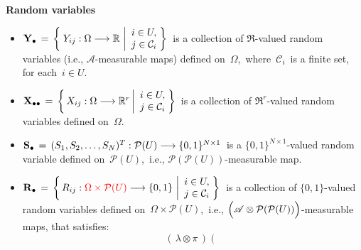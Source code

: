 \vskip 0.2cm
\noindent
\textbf{Random variables}
\begin{itemize}
\item
    $
    \mathbf{Y}_{\bullet}
    \, = \,
        \left\{\;
            Y_{ij} : \Omega \longrightarrow \mathbb{R}
            \,\left\vert
            \begin{array}{c} i \in U, \\ j \in \mathcal{C}_{i} \end{array}
            \right.
            \!\!\right\}
    $\,
    is a collection of $\Re$-valued random variables
    (i.e., $\mathscr{A}$-measurable maps)
    defined on \,$\Omega$,\,
    where \,$\mathcal{C}_{i}$\, is a finite set, for each \,$i \in U$.
\item
    $
    \mathbf{X}_{\bullet\bullet}
    \, = \,
        \left\{\,
            X_{ij} : \Omega \longrightarrow \mathbb{R}^{r}
            \left\vert
            \begin{array}{c} i \in U, \\ j \in \mathcal{C}_{i} \end{array}
            \right.
            \!\!\right\}
    $\,
    is a collection of $\Re^{r}$-valued random variables defined on \,$\Omega$.\,
\item
    $\mathbf{S}_{\bullet} \,=\, (S_{1},S_{2},\ldots,S_{N})^{T} : \mathcal{P}(U) \longrightarrow \{0,1\}^{N \times 1}$\,
    is a $\{0,1\}^{N \times 1}$-valued random variable defined on \,$\mathcal{P}(U)$,\,
    i.e., $\mathcal{P}(\mathcal{P}(U))$-measurable map.
\item
    $
    \mathbf{R}_{\bullet}
    \, = \,
        \left\{\,
            R_{ij} : {\color{red}\Omega \times \mathcal{P}(U)} \longrightarrow \{0,1\}
            \,\left\vert
            \begin{array}{c} i \in U, \\ j \in \mathcal{C}_{i} \end{array}
            \right.
            \!\!\right\}
    $\,
    is a collection of $\{0,1\}$-valued random variables
    defined on \,$\Omega \times \mathcal{P}(U)$,\,
    i.e.,
    $\left(\mathscr{A} \overset{{\color{white}.}}{\otimes} \mathcal{P}(\mathcal{P}(U))\right)$-measurable maps, that satisfies:
    \begin{equation*}
    (\,\lambda\otimes\pi\,)\!\left(\;\,

\end{equation*}
\end{itemize}
